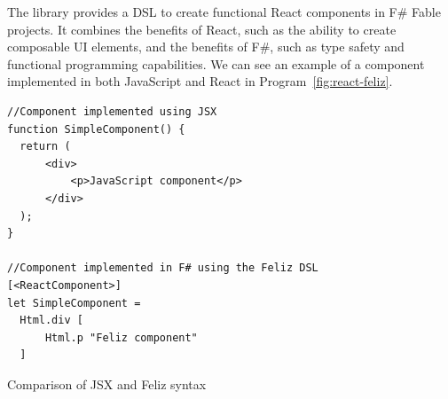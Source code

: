 The \citet{feliz} library provides a DSL to create functional React components in F\# Fable projects.
It combines the benefits of React, such as the ability to create composable UI elements, and the benefits of F\#, such as type safety and functional programming capabilities.
We can see an example of a component implemented in both JavaScript and React in Program~\ref{fig:react-feliz}.
\begin{listing}
	\begin{center}
		\begin{lstlisting}
//Component implemented using JSX
function SimpleComponent() {
  return (
      <div>
          <p>JavaScript component</p>
      </div>
  );
} 

//Component implemented in F# using the Feliz DSL
[<ReactComponent>]
let SimpleComponent = 
  Html.div [
      Html.p "Feliz component"
  ]
  \end{lstlisting}
	\end{center}
	\caption{Comparison of JSX and Feliz syntax}
	\label{fig:react-feliz}
\end{listing}

